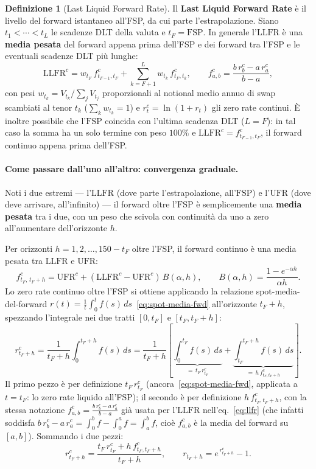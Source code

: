 \documentclass[11pt,a4paper]{article}
\theoremstyle{plain}
\theoremstyle{definition}
\newtheorem{definizione}[teorema]{Definizione}
\theoremstyle{remark}
\newcommand{\UFR}{\mathrm{UFR}}
\newcommand{\LLFR}{\mathrm{LLFR}}
\newcommand{\FSP}{\mathrm{FSP}}
\begin{document}
\begin{definizione}[Last Liquid Forward Rate]
\label{def:llfr}
Il \textbf{Last Liquid Forward Rate} \`e il livello del forward istantaneo all'FSP, da cui
parte l'estrapolazione. Siano $t_1<\cdots<t_L$ le scadenze DLT della valuta e $t_F=\FSP$. In
generale l'$\LLFR$ \`e una \textbf{media pesata}
del forward appena prima dell'FSP e dei forward tra l'FSP e le eventuali scadenze DLT pi\`u
lunghe:
\begin{equation}
  \label{eq:llfr}
  \LLFR^c = w_{t_F}\,f^c_{t_{F-1},t_F} + \sum_{k=F+1}^{L} w_{t_k}\,f^c_{t_F,t_k},
  \qquad
  f^c_{a,b} = \frac{b\,r^c_b - a\,r^c_a}{b-a},
\end{equation}
con pesi $w_{t_k}=V_{t_k}/\sum_j V_{t_j}$ proporzionali al notional medio annuo di swap
scambiati al tenor $t_k$ ($\sum_k w_{t_k}=1$) e $r^c_t=\ln(1+r_t)$ gli zero rate continui.
\`E inoltre possibile che l'$\FSP$ coincida con l'ultima scadenza DLT ($L=F$): in tal caso la somma ha un solo termine con peso $100\%$ e
$\LLFR^c=f^c_{t_{F-1},t_F}$, il forward continuo appena prima dell'FSP.
\end{definizione}

\paragraph{Come passare dall'uno all'altro: convergenza graduale.}
Noti i due estremi --- l'$\LLFR$ (dove parte l'estrapolazione, all'$\FSP$) e l'$\UFR$ (dove deve
arrivare, all'infinito) --- il forward oltre l'$\FSP$ \`e semplicemente una \textbf{media pesata}
tra i due, con un peso che scivola con continuit\`a da uno a zero all'aumentare
dell'orizzonte $h$.

Per orizzonti $h=1,2,\ldots,150-t_F$ oltre l'FSP, il forward continuo \`e una media pesata tra
$\LLFR$ e $\UFR$:
\begin{equation}
  f^c_{t_F,\,t_F+h} = \UFR^c + (\LLFR^c - \UFR^c)\,B(\alpha,h),
  \qquad
  B(\alpha,h) = \frac{1 - e^{-\alpha h}}{\alpha h}.
  \label{eq:extrap-fwd}
\end{equation}
Lo zero rate continuo oltre l'FSP si ottiene applicando la relazione spot-media-del-forward
$r(t)=\frac{1}{t}\int_0^t f(s)\,ds$~\eqref{eq:spot-media-fwd} all'orizzonte $t_F+h$, spezzando
l'integrale nei due tratti $[0,t_F]$ e $[t_F,t_F+h]$:
\[
r^c_{t_F+h} = \frac{1}{t_F+h}\int_0^{t_F+h} f(s)\,ds
= \frac{1}{t_F+h}\left[\underbrace{\int_0^{t_F} f(s)\,ds}_{=\,t_F\,r^c_{t_F}}
+ \underbrace{\int_{t_F}^{t_F+h} f(s)\,ds}_{=\,h\,f^c_{t_F,t_F+h}}\right].
\]
Il primo pezzo \`e per definizione $t_F\,r^c_{t_F}$ (ancora~\eqref{eq:spot-media-fwd}, applicata a
$t=t_F$: lo zero rate liquido all'FSP); il secondo \`e per definizione $h\,f^c_{t_F,t_F+h}$, con
la stessa notazione $f^c_{a,b}=\frac{b\,r^c_b-a\,r^c_a}{b-a}$ gi\`a usata per l'$\LLFR$
nell'eq.~\eqref{eq:llfr} (che infatti soddisfa $b\,r^c_b-a\,r^c_a=\int_0^b f-\int_0^a
f=\int_a^b f$, cio\`e $f^c_{a,b}$ \`e la media del forward su $[a,b]$). Sommando i due pezzi:
\begin{equation}
  \label{eq:extrap-zero}
  r^c_{t_F+h} = \frac{t_F\,r^c_{t_F} + h\,f^c_{t_F,t_F+h}}{t_F+h},
  \qquad
  r_{t_F+h} = e^{\,r^c_{t_F+h}} - 1.
\end{equation}
\end{document}
